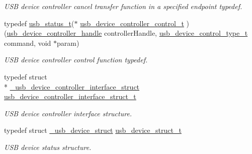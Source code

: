 \begin{DoxyCompactItemize}
\begin{DoxyCompactList}\small\item\em U\-S\-B device controller cancel transfer function in a specified endpoint typedef. \end{DoxyCompactList}\item 
typedef \hyperlink{group__usb__drv_ga3172b9f50553fb6d8aa2823d10a39c58}{usb\-\_\-status\-\_\-t}($\ast$ \hyperlink{group__usb__device__controller__driver_gae484b958b5a84af6ce5921f8538ff1c4}{usb\-\_\-device\-\_\-controller\-\_\-control\-\_\-t} )(\hyperlink{group__usb__device__controller__driver_gaec03ce2e4732aa876cd2a91cf8e93b5b}{usb\-\_\-device\-\_\-controller\-\_\-handle} controller\-Handle, \hyperlink{group__usb__device__controller__driver_gae16dc18943ae9da34a2b122859568b5e}{usb\-\_\-device\-\_\-control\-\_\-type\-\_\-t} command, void $\ast$param)
\begin{DoxyCompactList}\small\item\em U\-S\-B device controller control function typedef. \end{DoxyCompactList}\item 
typedef struct \\*
\hyperlink{struct__usb__device__controller__interface__struct}{\-\_\-usb\-\_\-device\-\_\-controller\-\_\-interface\-\_\-struct} \hyperlink{group__usb__device__controller__driver_ga634411452886b58586be873d8d631a3b}{usb\-\_\-device\-\_\-controller\-\_\-interface\-\_\-struct\-\_\-t}
\begin{DoxyCompactList}\small\item\em U\-S\-B device controller interface structure. \end{DoxyCompactList}\item 
typedef struct \hyperlink{struct__usb__device__struct}{\-\_\-usb\-\_\-device\-\_\-struct} \hyperlink{group__usb__device__controller__driver_ga4be463ccd1fe520b377febafb0a06c2f}{usb\-\_\-device\-\_\-struct\-\_\-t}
\begin{DoxyCompactList}\small\item\em U\-S\-B device status structure. \end{DoxyCompactList}\end{DoxyCompactItemize}
